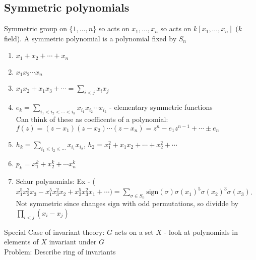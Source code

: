 
\subsection{Symmetric polynomials} 


Symmetric group on $\{1, \ldots, n\}$ so acts on $x_1, \ldots, x_n$ so acts on $k[x_1, \ldots, x_n]$ ($k$ field). A symmetric polynomial is a polynomial fixed by $S_n$ 

\begin{example}
    \begin{enumerate}
        \item $x_1 + x_2  + \cdots + x_n$ 
        \item $x_1 x_2 \cdots x_n$ 
        \item $x_1x_2 + x_1x_3 + \cdots = \sum_{i < j}x_ix_j$ 
        \item $e_k = \sum_{i_1 < i_2 < \cdots < i_k}x_{i_1} x_{i_2} \cdots x_{i_k}$ - elementary symmetric functions \\
        Can think of these as coefficents of a polynomial: $f(z) = (z-x_1)(z-x_2) \cdots (z-x_n) = z^n - e_1z^{n-1} + \cdots \pm e_n$ 
        \item $h_k = \sum_{i_1 \le i_2 \le \cdots}x_{i_1}x_{i_2}$, $h_2 = x_1^2 + x_1x_2 + \cdots + x_2^2 + \cdots$ 
        \item $p_k = x_1^k + x_2^k + \cdots x_n^k$ 
        \item Schur polynomials: Ex - ($x_1^5x_2^2x_3 - x_1^5x_3^2x_2 + x_2^5x_3^2x_1 + \cdots) = \sum_{\sigma \in S_n} \text{sign}(\sigma) \sigma(x_1)^5 \sigma(x_2)^3\sigma(x_3)$. Not symmetric since changes sign with odd permutations, so dividde by $\prod_{i < j}(x_i - x_j)$ 
    \end{enumerate}
\end{example}

\noindent
Special Case of invariant theory: $G$ acts on a set $X$ - look at polynomials in elements of $X$ invariant under $G$ \\ 
Problem: Describe ring of invariants 

